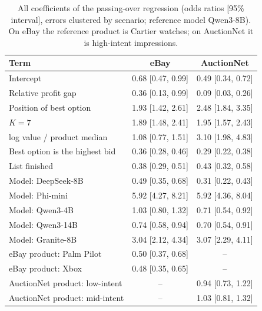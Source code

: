 \begin{table}[h!]
\caption{All coefficients of the passing-over regression (odds ratios [95\% interval], errors clustered by scenario; reference model Qwen3-8B). On eBay the reference product is Cartier watches; on AuctionNet it is high-intent impressions.}
\label{tab:regfull}
\footnotesize
\centering

\begin{tabular}{lcc}
\toprule
Term & eBay & AuctionNet \\
\midrule
Intercept & 0.68 [0.47, 0.99] & 0.49 [0.34, 0.72] \\
Relative profit gap & 0.36 [0.13, 0.99] & 0.09 [0.03, 0.26] \\
Position of best option & 1.93 [1.42, 2.61] & 2.48 [1.84, 3.35] \\
$K=7$ & 1.89 [1.48, 2.41] & 1.95 [1.57, 2.43] \\
log value / product median & 1.08 [0.77, 1.51] & 3.10 [1.98, 4.83] \\
Best option is the highest bid & 0.36 [0.28, 0.46] & 0.29 [0.22, 0.38] \\
List finished & 0.38 [0.29, 0.51] & 0.43 [0.32, 0.58] \\
Model: DeepSeek-8B & 0.49 [0.35, 0.68] & 0.31 [0.22, 0.43] \\
Model: Phi-mini & 5.92 [4.27, 8.21] & 5.92 [4.36, 8.04] \\
Model: Qwen3-4B & 1.03 [0.80, 1.32] & 0.71 [0.54, 0.92] \\
Model: Qwen3-14B & 0.74 [0.58, 0.94] & 0.70 [0.54, 0.91] \\
Model: Granite-8B & 3.04 [2.12, 4.34] & 3.07 [2.29, 4.11] \\
eBay product: Palm Pilot & 0.50 [0.37, 0.68] & -- \\
eBay product: Xbox & 0.48 [0.35, 0.65] & -- \\
AuctionNet product: low-intent & -- & 0.94 [0.73, 1.22] \\
AuctionNet product: mid-intent & -- & 1.03 [0.81, 1.32] \\
\bottomrule
\end{tabular}
\end{table}
